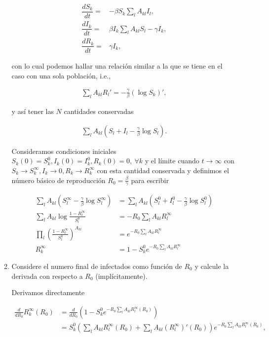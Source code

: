 \documentclass[answers]{exam}
\begin{document}
\begin{questions}
\begin{enumerate}
\begin{enumerate}
\begin{solution}
\begin{align*}
    \dfrac{dS_k}{dt}=&-\beta S_k\sum_lA_{kl}I_l,\\
    \dfrac{dI_k}{dt}=&\beta I_k\sum_lA_{kl}S_l -\gamma I_k,\\
    \dfrac{dR_k}{dt}=&\gamma I_k,
\end{align*}

con lo cual podemos hallar una relación similar a la que se tiene en el caso con una sola población, i.e.,

\begin{align*}
    \sum_lA_{kl}R_l' = -\frac{\gamma}{\beta}(\log{S_k})',
\end{align*}

y así tener las $N$ cantidades conservadas

\begin{align*}
    \sum_lA_{kl}(S_l + I_l -\frac{\gamma}{\beta}\log{S_l}).
\end{align*}

Consideramos condiciones iniciales $S_k(0) = S_k^0, I_k(0) = I_k^0, R_k(0) = 0, \ \forall k$ y el límite cuando $t \to \infty$ con $S_k \to S_k^\infty, I_k \to 0, R_k \to R_k^\infty$ con esta cantidad conservada y definimos el número básico de reproducción $R_0 = \tfrac{\beta}{\gamma}$ para escribir

\begin{align*}
    \sum_lA_{kl}(S_l^\infty -\frac{\gamma}{\beta}\log{S_l^\infty}) &= \sum_lA_{kl}(S_l^0 + I_l^0 -\frac{\gamma}{\beta}\log{S_l^0})\\
    \sum_lA_{kl}\log{\frac{1 - R_l^\infty}{S_l^0}} &= -R_0\sum_lA_{kl}R_l^\infty\\
    \prod_l\left(\frac{1 - R_l^\infty}{S_l^0}\right)^{A_{kl}} &= e^{-R_0\sum_lA_{kl}R_l^\infty}\\
    R_k^\infty &= 1 - S_k^0e^{-R_0\sum_lA_{kl}R_l^\infty}
\end{align*}
\end{solution}

\item Considere el numero final de infectados como función de $R_0$ y calcule la derivada con respecto a $R_0$ (implícitamente).

\begin{solution}
Derivamos directamente

\begin{align*}
    \frac{d}{dR_0}R_k^\infty(R_0) &= \frac{d}{dR_0}\left(1 - S_k^0e^{-R_0\sum_lA_{kl}R_l^\infty(R_0)}\right)\\
    &= S_k^0\left(\sum_lA_{kl}R_l^\infty(R_0) + \sum_lA_{kl}(R_l^\infty)'(R_0)\right) e^{-R_0\sum_lA_{kl}R_l^\infty(R_0)},
\end{align*}


\end{solution}
\end{enumerate}
\end{enumerate}
\end{questions}
\end{document}

